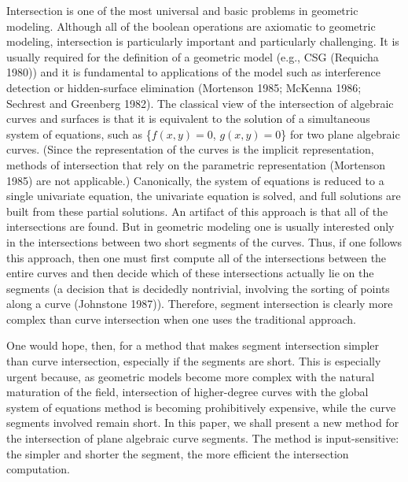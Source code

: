 Intersection is one of the most universal and basic problems in geometric modeling.
Although all of the boolean operations are axiomatic to geometric modeling, 
intersection is particularly important and particularly challenging.
It is usually required for the definition of a geometric model (e.g., CSG (Requicha 1980))  
and it is fundamental to applications of the model such as interference detection or 
hidden-surface elimination (Mortenson 1985; McKenna 1986; Sechrest and Greenberg 1982).
The classical view of the intersection of algebraic curves and surfaces is 
that it is equivalent to the solution of a 
simultaneous system of equations, such as \{$f(x,y)=0$, $g(x,y)=0$\} for two
plane algebraic curves.
(Since the representation of the curves is
	the implicit representation, methods of intersection that rely on 
	the parametric representation (Mortenson 1985) are not applicable.)
Canonically, the system of equations is reduced to a single univariate equation, 
the univariate equation is solved, and full solutions are built from these partial 
solutions.
An artifact of this approach is that all of the intersections are found.
But in geometric modeling one is usually interested only in the intersections
between two short segments of the curves.
Thus, if one follows this approach, then one must first compute 
all of the intersections between the entire curves
and then decide which of these intersections actually lie on the segments 
(a decision that is decidedly nontrivial, involving the sorting of 
points along a curve (Johnstone 1987)).
Therefore, segment intersection is clearly more complex than curve intersection
when one uses the traditional approach.

One would hope, then, for a method that makes segment intersection simpler than curve 
intersection, especially if the segments are short.
This is especially urgent because, as geometric models become more complex with 
the natural maturation of the field, intersection of higher-degree curves 
with the global system of equations method is becoming prohibitively expensive, 
while the curve segments involved remain short.
In this paper, we shall present a new method for the intersection of plane
algebraic curve segments.
The method is input-sensitive: the simpler and shorter the segment, 
the more efficient the intersection computation.

